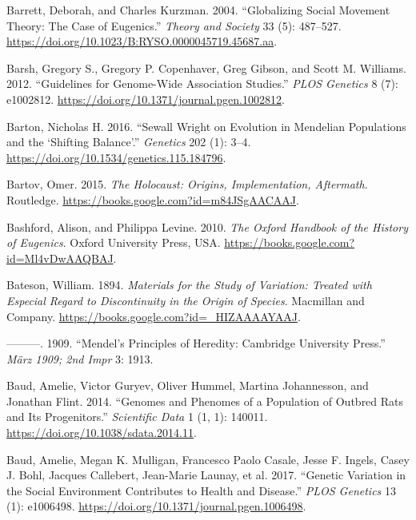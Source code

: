\documentclass[
]{book}
\newlength{\cslhangindent}
\newlength{\cslentryspacingunit} %
\newenvironment{CSLReferences}[2] %
 {%
  \setlength{\parindent}{0pt}
  \ifodd #1
  \let\oldpar\par
  \def\par{\hangindent=\cslhangindent\oldpar}
  \fi
  \setlength{\parskip}{#2\cslentryspacingunit}
 }%
 {}
\begin{document}
\begin{CSLReferences}{1}{0}
\leavevmode{}%
Barrett, Deborah, and Charles Kurzman. 2004. {``Globalizing Social Movement Theory: {The} Case of Eugenics.''} \emph{Theory and Society} 33 (5): 487--527. \url{https://doi.org/10.1023/B:RYSO.0000045719.45687.aa}.

\leavevmode{}%
Barsh, Gregory S., Gregory P. Copenhaver, Greg Gibson, and Scott M. Williams. 2012. {``Guidelines for {Genome-Wide Association Studies}.''} \emph{PLOS Genetics} 8 (7): e1002812. \url{https://doi.org/10.1371/journal.pgen.1002812}.

\leavevmode{}%
Barton, Nicholas H. 2016. {``Sewall {Wright} on {Evolution} in {Mendelian Populations} and the {`{Shifting Balance}'}.''} \emph{Genetics} 202 (1): 3--4. \url{https://doi.org/10.1534/genetics.115.184796}.

\leavevmode{}%
Bartov, Omer. 2015. \emph{The {Holocaust}: {Origins}, {Implementation}, {Aftermath}}. {Routledge}. \url{https://books.google.com?id=m84JSgAACAAJ}.

\leavevmode{}%
Bashford, Alison, and Philippa Levine. 2010. \emph{The {Oxford Handbook} of the {History} of {Eugenics}}. {Oxford University Press, USA}. \url{https://books.google.com?id=Ml4vDwAAQBAJ}.

\leavevmode{}%
Bateson, William. 1894. \emph{Materials for the {Study} of {Variation}: {Treated} with {Especial Regard} to {Discontinuity} in the {Origin} of {Species}}. {Macmillan and Company}. \url{https://books.google.com?id=_HIZAAAAYAAJ}.

\leavevmode{}%
---------. 1909. {``Mendel's {Principles} of {Heredity}: {Cambridge University Press}.''} \emph{März 1909; 2nd Impr} 3: 1913.

\leavevmode{}%
Baud, Amelie, Victor Guryev, Oliver Hummel, Martina Johannesson, and Jonathan Flint. 2014. {``Genomes and Phenomes of a Population of Outbred Rats and Its Progenitors.''} \emph{Scientific Data} 1 (1, 1): 140011. \url{https://doi.org/10.1038/sdata.2014.11}.

\leavevmode{}%
Baud, Amelie, Megan K. Mulligan, Francesco Paolo Casale, Jesse F. Ingels, Casey J. Bohl, Jacques Callebert, Jean-Marie Launay, et al. 2017. {``Genetic {Variation} in the {Social Environment Contributes} to {Health} and {Disease}.''} \emph{PLOS Genetics} 13 (1): e1006498. \url{https://doi.org/10.1371/journal.pgen.1006498}.


\end{CSLReferences}
\end{document}
